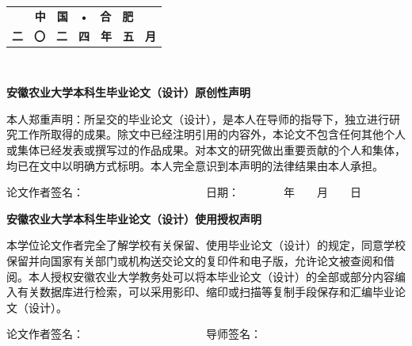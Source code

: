 \documentclass[UTF8,a4paper,12pt]{ctexart}
\begin{document}
	\vspace{4cm} 
	\begin{table}[!h]
		\renewcommand\arraystretch{1.8}
		\setlength\tabcolsep{16pt}
		\centering
		\begin{tabular}{c}
			\textbf{\fontsize{16pt}{\baselineskip}\heiti 中　国　•　合　肥 }\\
			\textbf{\fontsize{16pt}{\baselineskip}\heiti 二　〇　二　四　年　五　月} \\
		\end{tabular}
	\end{table}
	\thispagestyle{empty}
	\newpage　
	\vspace{1cm} \par \textbf{\fontsize{18pt}{\baselineskip}\heiti 安徽农业大学本科生毕业论文（设计）原创性声明}
	\vspace{1cm} \par 本人郑重声明：所呈交的毕业论文（设计），是本人在导师的指导下，独立进行研究工作所取得的成果。除文中已经注明引用的内容外，本论文不包含任何其他个人或集体已经发表或撰写过的作品成果。对本文的研究做出重要贡献的个人和集体，均已在文中以明确方式标明。本人完全意识到本声明的法律结果由本人承担。
	\vspace{1cm} \par 论文作者签名：　　　　　　　　　　　日期：　　　　年　　月　　日
	\vspace{6cm} \par \textbf{\fontsize{18pt}{\baselineskip}\heiti  安徽农业大学本科生毕业论文（设计）使用授权声明}
	\vspace{1cm} \par 本学位论文作者完全了解学校有关保留、使用毕业论文（设计）的规定，同意学校保留并向国家有关部门或机构送交论文的复印件和电子版，允许论文被查阅和借阅。本人授权安徽农业大学教务处可以将本毕业论文（设计）的全部或部分内容编入有关数据库进行检索，可以采用影印、缩印或扫描等复制手段保存和汇编毕业论文（设计）。
	\vspace{1cm} \par 论文作者签名：　　　　　　　　　　　导师签名：
	\thispagestyle{empty}
	
	\newpage
	
\end{document}
